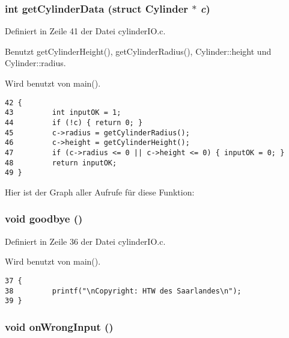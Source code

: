 \subsubsection{\setlength{\rightskip}{0pt plus 5cm}int get\-Cylinder\-Data (struct {\bf Cylinder} $\ast$ {\em c})}\label{cylinder_i_o_8h_9c325db5f2a19b9e8882666eb60ea0b2}




Definiert in Zeile 41 der Datei cylinder\-IO.c.

Benutzt get\-Cylinder\-Height(), get\-Cylinder\-Radius(), Cylinder::height und Cylinder::radius.

Wird benutzt von main().

\footnotesize\begin{verbatim}42 {
43         int inputOK = 1;
44         if (!c) { return 0; }
45         c->radius = getCylinderRadius();
46         c->height = getCylinderHeight();
47         if (c->radius <= 0 || c->height <= 0) { inputOK = 0; }
48         return inputOK;
49 }
\end{verbatim}\normalsize 




Hier ist der Graph aller Aufrufe f\"{u}r diese Funktion:
\subsubsection{\setlength{\rightskip}{0pt plus 5cm}void goodbye ()}\label{cylinder_i_o_8h_9d02e3c6092fbd61a94d4bda90de3fc5}




Definiert in Zeile 36 der Datei cylinder\-IO.c.

Wird benutzt von main().

\footnotesize\begin{verbatim}37 {
38         printf("\nCopyright: HTW des Saarlandes\n");
39 }
\end{verbatim}\normalsize 


\subsubsection{\setlength{\rightskip}{0pt plus 5cm}void on\-Wrong\-Input ()}\label{cylinder_i_o_8h_ac5129efd394503c2590d23da2c37561}




